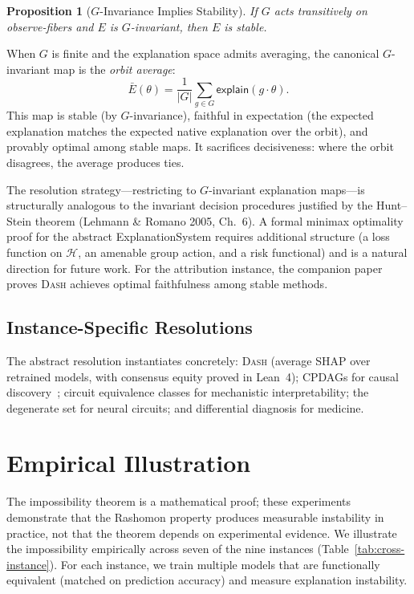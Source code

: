 \documentclass[twocolumn]{article}
\newtheorem{proposition}{Proposition}
\newcommand{\DASH}{\textsc{Dash}}
\newcommand{\sH}{\mathcal{H}}
\begin{document}
\begin{proposition}[$G$-Invariance Implies Stability]
\label{prop:g-stable}
If $G$ acts transitively on observe-fibers and $E$ is $G$-invariant, then
$E$ is stable.
\end{proposition}

When $G$ is finite and the explanation space admits averaging, the
canonical $G$-invariant map is the \emph{orbit average}:
\[
  \bar{E}(\theta) = \frac{1}{|G|}\sum_{g \in G} \mathsf{explain}(g \cdot \theta).
\]
This map is stable (by $G$-invariance), faithful in expectation (the
expected explanation matches the expected native explanation over the
orbit), and provably optimal among stable maps. It sacrifices decisiveness:
where the orbit disagrees, the average produces ties.

The resolution strategy---restricting to $G$-invariant explanation
maps---is structurally analogous to the invariant decision procedures
justified by the Hunt--Stein theorem (Lehmann \& Romano 2005, Ch.~6).
A formal minimax optimality proof for the abstract ExplanationSystem
requires additional structure (a loss function on $\sH$, an amenable
group action, and a risk functional) and is a natural direction for
future work. For the attribution instance, the companion paper proves
\DASH{} achieves optimal faithfulness among stable methods.

\subsection{Instance-Specific Resolutions}

The abstract resolution instantiates concretely: \DASH{} (average SHAP
over retrained models, with consensus equity proved in Lean~4); CPDAGs
for causal discovery~\cite{chickering2002optimal}; circuit equivalence
classes for mechanistic interpretability; the degenerate set for neural
circuits; and differential diagnosis for medicine.


\section{Empirical Illustration}
\label{sec:experiments}

The impossibility theorem is a mathematical proof; these experiments
demonstrate that the Rashomon property produces measurable instability in
practice, not that the theorem depends on experimental evidence.
We illustrate the impossibility empirically across seven of the nine
instances (Table~\ref{tab:cross-instance}). For each instance, we train
multiple models that are functionally equivalent (matched on prediction
accuracy) and measure explanation instability.
\end{document}
